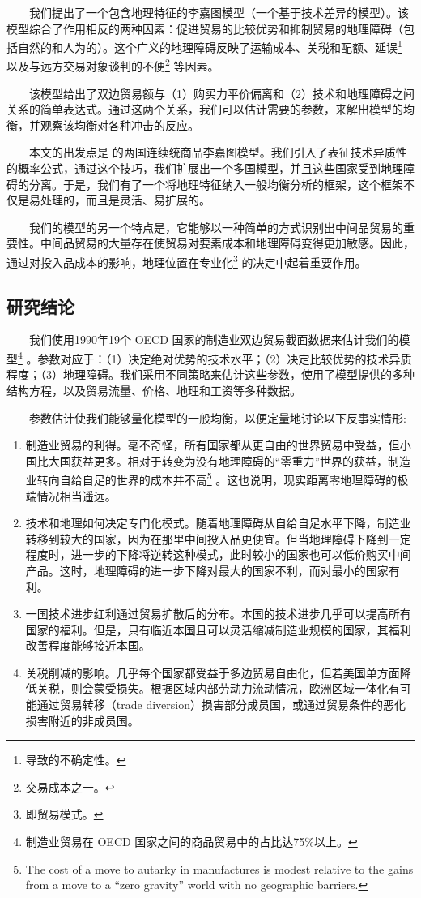 \documentclass[]{tufte-handout}
\begin{document}
　　我们提出了一个包含地理特征的李嘉图模型（一个基于技术差异的模型）。该模型综合了作用相反的两种因素：促进贸易的比较优势和抑制贸易的地理障碍（包括自然的和人为的）。这个广义的地理障碍反映了运输成本、关税和配额、延误\footnote{导致的不确定性。}
以及与远方交易对象谈判的不便\footnote{交易成本之一。} 等因素。

　　该模型给出了双边贸易额与（1）购买力平价偏离和（2）技术和地理障碍之间关系的简单表达式。通过这两个关系，我们可以估计需要的参数，来解出模型的均衡，并观察该均衡对各种冲击的反应。

　　本文的出发点是 \citet{DFS1977}
的两国连续统商品李嘉图模型。我们引入了表征技术异质性的概率公式，通过这个技巧，我们扩展出一个多国模型，并且这些国家受到地理障碍的分离。于是，我们有了一个将地理特征纳入一般均衡分析的框架，这个框架不仅是易处理的，而且是灵活、易扩展的。

　　我们的模型的另一个特点是，它能够以一种简单的方式识别出中间品贸易的重要性。中间品贸易的大量存在使贸易对要素成本和地理障碍变得更加敏感。因此，通过对投入品成本的影响，地理位置在专业化\footnote{即贸易模式。}
的决定中起着重要作用。

\hypertarget{ux7814ux7a76ux7ed3ux8bba}{%
\subsection{研究结论}\label{ux7814ux7a76ux7ed3ux8bba}}

　　我们使用1990年19个 OECD
国家的制造业双边贸易截面数据来估计我们的模型\footnote{制造业贸易在 OECD
  国家之间的商品贸易中的占比达75\%以上。}
。参数对应于：（1）决定绝对优势的技术水平；（2）决定比较优势的技术异质程度；（3）地理障碍。我们采用不同策略来估计这些参数，使用了模型提供的多种结构方程，以及贸易流量、价格、地理和工资等多种数据。

　　参数估计使我们能够量化模型的一般均衡，以便定量地讨论以下反事实情形:

\begin{enumerate}
\def\labelenumi{\arabic{enumi}.}
\item
  制造业贸易的利得。毫不奇怪，所有国家都从更自由的世界贸易中受益，但小国比大国获益更多。相对于转变为没有地理障碍的``零重力''世界的获益，制造业转向自给自足的世界的成本并不高\footnote{The
    cost of a move to autarky in manufactures is modest relative to the
    gains from a move to a ``zero gravity'' world with no geographic
    barriers.} 。这也说明，现实距离零地理障碍的极端情况相当遥远。
\item
  技术和地理如何决定专门化模式。随着地理障碍从自给自足水平下降，制造业转移到较大的国家，因为在那里中间投入品更便宜。但当地理障碍下降到一定程度时，进一步的下降将逆转这种模式，此时较小的国家也可以低价购买中间产品。这时，地理障碍的进一步下降对最大的国家不利，而对最小的国家有利。
\item
  一国技术进步红利通过贸易扩散后的分布。本国的技术进步几乎可以提高所有国家的福利。但是，只有临近本国且可以灵活缩减制造业规模的国家，其福利改善程度能够接近本国。
\item
  关税削减的影响。几乎每个国家都受益于多边贸易自由化，但若美国单方面降低关税，则会蒙受损失。根据区域内部劳动力流动情况，欧洲区域一体化有可能通过贸易转移（trade
  diversion）损害部分成员国，或通过贸易条件的恶化损害附近的非成员国。
\end{enumerate}
\end{document}
